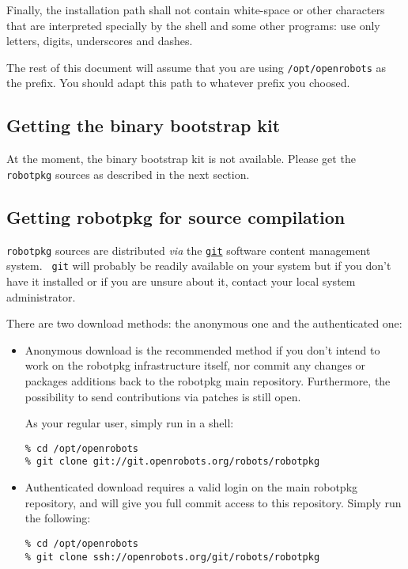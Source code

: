 Finally,  the  installation  path   shall  not  contain  white-space  or  other
characters that are interpreted specially by the shell and some other programs:
use only letters, digits, underscores and dashes.

The rest of this document will  assume that you are using {\tt /opt/openrobots}
as the prefix. You should adapt this path to whatever prefix you choosed.


\subsection{Getting the binary bootstrap kit}

At the moment, the  binary bootstrap kit is not  available. Please get the {\tt
robotpkg} sources as described in the next section.


\subsection{Getting robotpkg for source compilation}

{\tt         robotpkg}    sources   are       distributed     {\em    via}  the
\href{http://git-scm.com/}{\tt git}  software  content management system.  {\tt
git} will probably be readily available on your system but if you don't have it
installed   or if you    are  unsure  about it,   contact  your  local   system
administrator.

There are two download methods: the anonymous one and the authenticated
one:

\begin{itemize}

  \item  Anonymous download is the  recommended method if  you  don't intend to
  work on  the   robotpkg infrastructure  itself,  nor commit   any  changes or
  packages  additions  back to  the  robotpkg main repository. Furthermore, the
  possibility to send contributions via patches is still open.

  As your regular user, simply run in a shell:

\begin{verbatim}
% cd /opt/openrobots
% git clone git://git.openrobots.org/robots/robotpkg
\end{verbatim}


  \item Authenticated   download requires a  valid  login on the  main robotpkg
  repository, and will give you full commit access  to this repository.  Simply
  run the following:

\begin{verbatim}
% cd /opt/openrobots
% git clone ssh://openrobots.org/git/robots/robotpkg
\end{verbatim}

\end{itemize}


